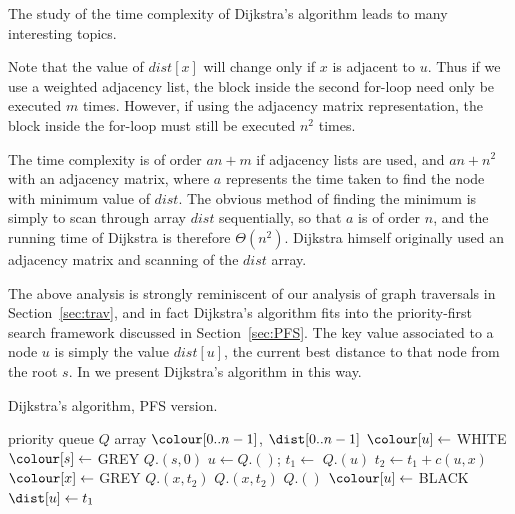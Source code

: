 The study of the time complexity of Dijkstra's algorithm leads to many
interesting topics.

Note that the value of $dist[x]$ will change only if $x$ is adjacent to
$u$. Thus if we use a weighted adjacency list, the block inside the
second for-loop need only be executed $m$ times. However, if
using the adjacency matrix representation, the block inside the for-loop
must still be executed $n^2$ times.

The time complexity is of order $a n + m$ if adjacency lists are used,
and $a n + n^2$ with an adjacency matrix, where $a$ represents the time
taken to find the node with minimum value of $dist$. The obvious method
of finding the minimum is simply to scan through array $dist$
sequentially, so that $a$ is of order $n$, and the running time of
Dijkstra is therefore $\Theta(n^2)$. Dijkstra himself originally used
an adjacency matrix and scanning of the $dist$ array. 

The above analysis is strongly reminiscent of our analysis of graph
traversals in Section~\ref{sec:trav}, and in fact Dijkstra's algorithm fits
into the priority-first search framework discussed in
Section~\ref{sec:PFS}. The key value associated to a node $u$ is simply the
value $dist[u]$, the current best distance to that node from the root $s$.
In  we present Dijkstra's algorithm in this
way.


\begin{algorithm}[H]
  \caption{Dijkstra's algorithm, PFS version.}
  \label{alg:dijkstra2}
\begin{algorithmic}[1]
	\State priority queue $Q$
	\State array $\colour[0..n-1]$, $\dist[0..n-1]$
		\State $\colour[u] \gets$ WHITE 
	\EndFor
	\State $\colour[s] \gets $ GREY
	\State $Q$.$(s, 0)$
		\State $u \gets Q$.$()$; $t_1 \gets$  $Q$.$(u)$
			\State $t_2 \gets t_1 + c(u, x)$
				\State $\colour[x] \gets $ GREY
				\State $Q$.$(x, t_2)$
				\State $Q$.$(x, t_2)$
			\EndIf
		\EndFor
		\State $Q$.$()$
		\State $\colour[u] \gets $ BLACK
		\State $\dist[u] \gets t_1$ 
	\EndWhile
	\State \Return{$\dist$}
\EndFunction
\end{algorithmic}
\end{algorithm}


